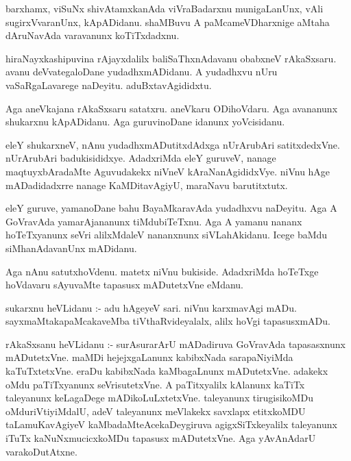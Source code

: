 \documentclass{article}
\begin{document}
\begin{mn}
barxhamx, viSuNx shivAtamxkanAda  viVraBadarxnu  munigaLanUnx,  vAli  sugirxVvaranUnx,  kApADidanu.  
shaMBuvu  A  paMcameVDharxnige  aMtaha  dAruNavAda  varavanunx  koTiTxdadxnu.
\end{mn}

\begin{mn}
hiraNayxkashipuvina  rAjayxdalilx  baliSaThxnAdavanu  obabxneV  rAkaSxsaru.  avanu  deVvategaloDane  
yudadhxmADidanu.  A  yudadhxvu  nUru  vaSaRgaLavarege  naDeyitu.  aduBxtavAgididxtu.
\end{mn}

\begin{mn}
Aga  aneVkajana  rAkaSxsaru  satatxru.  aneVkaru  ODihoVdaru.  Aga  avananunx  shukarxnu  kApADidanu.  
Aga  guruvinoDane  idanunx  yoVcisidanu.
\end{mn}

\begin{mn}
eleY  shukarxneV,  nAnu  yudadhxmADutitxdAdxga  nUrArubAri  satitxdedxVne.  nUrArubAri  badukisididxye.  AdadxriMda  
eleY  guruveV,  nanage  maqtuyxbAradaMte  Aguvudakekx  niVneV  kAraNanAgididxVye.  niVnu  hAge  mADadidadxrre  nanage 
 KaMDitavAgiyU,  maraNavu barutitxtutx.
\end{mn}

\begin{mn}
eleY  guruve,  yamanoDane  bahu  BayaMkaravAda  yudadhxvu  naDeyitu.  Aga  A  GoVravAda  yamarAjananunx  tiMdubiTeTxnu.  
Aga  A  yamanu  nananx  hoTeTxyanunx  seVri  alilxMdaleV  nananxnunx  siVLahAkidanu.  Icege  baMdu  siMhanAdavanUnx  mADidanu.
\end{mn}

\begin{mn}
Aga  nAnu  satutxhoVdenu.  matetx  niVnu  bukiside.  AdadxriMda  hoTeTxge  hoVdavaru  sAyuvaMte  tapasusx  mADutetxVne  eMdanu.                                                                                                      
\end{mn}

\begin{mn}
sukarxnu  heVLidanu :- adu  hAgeyeV  sari.  niVnu  karxmavAgi  mADu.  sayxmaMtakapaMcakaveMba  tiVthaRvideyalalx,  alilx  hoVgi  tapasusxmADu.
\end{mn}

\begin{mn}
rAkaSxsanu  heVLidanu :- surAsurarArU  mADadiruva  GoVravAda  tapasasxnunx  mADutetxVne.  maMDi   hejejxgaLanunx  kabibxNada  
sarapaNiyiMda  kaTuTxtetxVne.  eraDu  kabibxNada  kaMbagaLnunx  mADutetxVne.  adakekx  oMdu  paTiTxyanunx  seVrisutetxVne.  
A  paTitxyalilx  kAlanunx  kaTiTx  taleyanunx  keLagaDege  mADikoLuLxtetxVne.  taleyanunx  tirugisikoMDu  oMduriVtiyiMdalU,  
adeV  taleyanunx  meVlakekx  savxlapx  etitxkoMDU  taLamuKavAgiyeV  kaMbadaMteAcekaDeygiruva  agigxSiTxkeyalilx  taleyanunx  
iTuTx  kaNuNxmucicxkoMDu  tapasusx  mADutetxVne.  Aga  yAvAnAdarU  varakoDutAtxne.
\end{mn}
\end{document}
